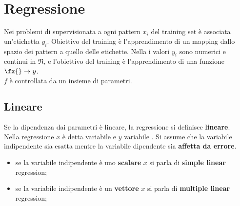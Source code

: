 \chapter{Regressione}\label{chap:regressione} %
Nei problemi di  supervisionata a ogni pattern $x_i$ del training set è associata un'etichetta $y_i$.
Obiettivo del training è l'apprendimento di un mapping dallo spazio dei pattern a quello delle etichette.
\emptyln{}
Nella  i valori $y_i$ sono numerici e continui in $\Re$, e l'obiettivo del training è l'apprendimento di una funzione $\fx{} \to y$.
\\
$f$ è controllata da un insieme di parametri.
\section{Lineare}\label{sec:lineare} %
Se la dipendenza dai parametri è lineare, la regressione si definisce \textbf{lineare}.
\\
Nella regressione $x$ è detta variabile  e $y$ variabile .
Si assume che la variabile indipendente sia esatta mentre la variabile dipendente sia \textbf{affetta da errore}.
\begin{itemize}
    \item se la variabile indipendente è uno \textbf{scalare} $x$ si parla di \textbf{simple linear} regression;
    \item se la variabile indipendente è un \textbf{vettore} $x$ si parla di \textbf{multiple linear} regression;
\end{itemize}
